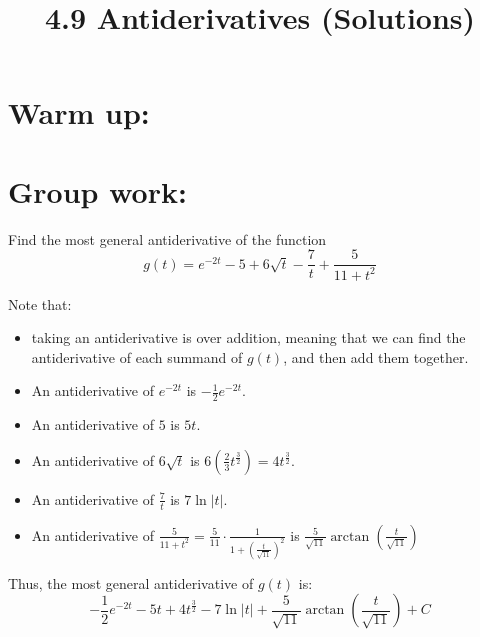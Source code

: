 \documentclass[nooutcomes]{ximera}
\title{4.9 Antiderivatives (Solutions)}
\begin{document}
\begin{abstract}		\end{abstract}
\maketitle

\section*{Warm up:} 

		\begin{freeResponse}
		
		\end{freeResponse}	
		
		
		

	
	
	
	
	

\section*{Group work:}



\begin{problem}
Find the most general antiderivative of the function
$$ g(t) = e^{-2t} - 5 + 6\sqrt{t}-\frac{7}{t} + \frac{5}{11 + t^2} $$
		\begin{freeResponse}
		Note that:
			\begin{itemize}
			\item  taking an antiderivative is  over addition, meaning that we can find the antiderivative of each summand of $g(t)$, and then add them together.
			\item  An antiderivative of $e^{-2t}$ is $-\frac{1}{2} e^{-2t}$.
			\item  An antiderivative of $5$ is $5t$.
			\item  An antiderivative of $6 \sqrt{t}$ is $6 \left( \frac{2}{3} t^{\frac{3}{2}} \right) = 4t^{\frac{3}{2}}$.
			\item  An antiderivative of $\frac{7}{t}$ is $7 \ln |t|$.
			\item  An antiderivative of $\frac{5}{11 + t^2} = \frac{5}{11} \cdot \frac{1}{1 + \left( \frac{t}{\sqrt{11}} \right)^2 }$
			is $\frac{5}{\sqrt{11}} \arctan \left( \frac{t}{\sqrt{11}} \right)$
			\end{itemize}
		Thus, the most general antiderivative of $g(t)$ is:
		$$ -\frac{1}{2} e^{-2t} - 5t + 4t^{\frac{3}{2}} - 7 \ln |t| + \frac{5}{\sqrt{11}} \arctan \left( \frac{t}{\sqrt{11}} \right) + C $$
		\end{freeResponse}
		
		
\end{problem}
\end{document}
